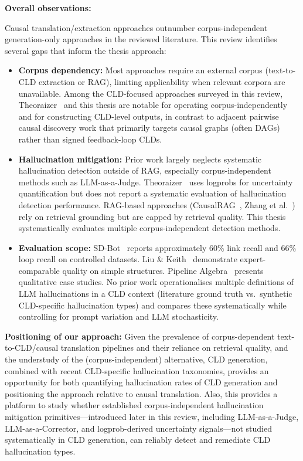 \noindent\textbf{Overall observations:}

\noindent Causal translation/extraction approaches outnumber corpus-independent generation-only approaches in the reviewed literature. This review identifies several gaps that inform the thesis approach:

\begin{itemize}[noitemsep]
    \item \textbf{Corpus dependency:} Most approaches require an external corpus (text-to-CLD extraction or RAG), limiting applicability when relevant corpora are unavailable. Among the CLD-focused approaches surveyed in this review, Theoraizer~\citep{Waaijers2024theoraizer} and this thesis are notable for operating corpus-independently and for constructing CLD-level outputs, in contrast to adjacent pairwise causal discovery work that primarily targets causal graphs (often DAGs) rather than signed feedback-loop CLDs.
    \item \textbf{Hallucination mitigation:} Prior work largely neglects systematic hallucination detection outside of RAG, especially corpus-independent methods such as LLM-as-a-Judge. Theoraizer~\citep{Waaijers2024theoraizer} uses logprobs for uncertainty quantification but does not report a systematic evaluation of hallucination detection performance. RAG-based approaches (CausalRAG~\citep{wang2025causalrag}, Zhang et al.~\citep{zhang2024causal}) rely on retrieval grounding but are capped by retrieval quality. This thesis systematically evaluates multiple corpus-independent detection methods.
    \item \textbf{Evaluation scope:} SD-Bot~\citep{hosseinichimeh2024textmapdynamicsbot} reports approximately 60\% link recall and 66\% loop recall on controlled datasets. Liu \& Keith~\citep{liu2025leveraging} demonstrate expert-comparable quality on simple structures. Pipeline Algebra~\citep{reinholtz2025pipelinealgebra} presents qualitative case studies. No prior work operationalises multiple definitions of LLM hallucinations in a CLD context (literature ground truth vs.\ synthetic CLD-specific hallucination types) and compares these systematically while controlling for prompt variation and LLM stochasticity.
\end{itemize}

\noindent\textbf{Positioning of our approach:} Given the prevalence of corpus-dependent text-to-CLD/causal translation pipelines and their reliance on retrieval quality, and the understudy of the (corpus-independent) alternative, CLD generation, combined with recent CLD-specific hallucination taxonomies, provides an opportunity for both quantifying hallucination rates of CLD generation and positioning the approach relative to causal translation. Also, this provides a platform to study whether established corpus-independent hallucination mitigation primitives---introduced later in this review, including LLM-as-a-Judge, LLM-as-a-Corrector, and logprob-derived uncertainty signals---not studied systematically in CLD generation, can reliably detect and remediate CLD hallucination types.

